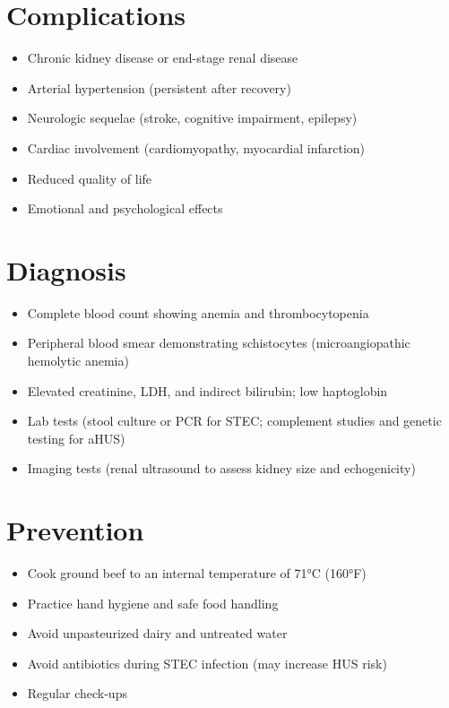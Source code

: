 \section{Complications}
\begin{itemize}[noitemsep]
  \item Chronic kidney disease or end-stage renal disease
  \item Arterial hypertension (persistent after recovery)
  \item Neurologic sequelae (stroke, cognitive impairment, epilepsy)
  \item Cardiac involvement (cardiomyopathy, myocardial infarction)
  \item Reduced quality of life
  \item Emotional and psychological effects
\end{itemize}

\section{Diagnosis}
\begin{itemize}[noitemsep]
  \item Complete blood count showing anemia and thrombocytopenia
  \item Peripheral blood smear demonstrating schistocytes (microangiopathic hemolytic anemia)
  \item Elevated creatinine, LDH, and indirect bilirubin; low haptoglobin
  \item Lab tests (stool culture or PCR for STEC; complement studies and genetic testing for aHUS)
  \item Imaging tests (renal ultrasound to assess kidney size and echogenicity)
\end{itemize}

\section{Prevention}
\begin{itemize}[noitemsep]
  \item Cook ground beef to an internal temperature of 71°C (160°F)
  \item Practice hand hygiene and safe food handling
  \item Avoid unpasteurized dairy and untreated water
  \item Avoid antibiotics during STEC infection (may increase HUS risk)
  \item Regular check-ups
\end{itemize}

